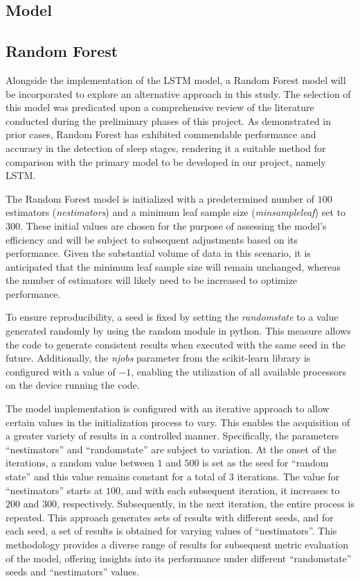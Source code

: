 \documentclass{article}
\begin{document}
    
 \subsection{Model}

 \subsection{Random Forest}

Alongside the implementation of the LSTM model, a Random Forest model will be incorporated to explore an alternative approach in this study. The selection of this model was predicated upon a comprehensive review of the literature conducted during the preliminary phases of this project. As demonstrated in prior cases, Random Forest has exhibited commendable performance and accuracy in the detection of sleep stages, rendering it a suitable method for comparison with the primary model to be developed in our project, namely LSTM.

The Random Forest model is initialized with a predetermined number of $100$ estimators (\textit{n\textunderscore estimators}) and a minimum leaf sample size (\textit{min\textunderscore sample\textunderscore leaf}) set to $300$. These initial values are chosen for the purpose of assessing the model's efficiency and will be subject to subsequent adjustments based on its performance. Given the substantial volume of data in this scenario, it is anticipated that the minimum leaf sample size will remain unchanged, whereas the number of estimators will likely need to be increased to optimize performance.

To ensure reproducibility, a seed is fixed by setting the \textit{random\textunderscore state} to a value generated randomly by using the random module in python. This measure allows the code to generate consistent results when executed with the same seed in the future. Additionally, the \textit{n\textunderscore jobs} parameter from the scikit-learn library is configured with a value of $-1$, enabling the utilization of all available processors on the device running the code.

The model implementation is configured with an iterative approach to allow certain values in the initialization process to vary. This enables the acquisition of a greater variety of results in a controlled manner. Specifically, the parameters ``n\textunderscore estimators'' and ``random\textunderscore state'' are subject to variation. At the onset of the iterations, a random value between $1$ and $500$ is set as the seed for ``random \textunderscore state'' and this value remains constant for a total of 3 iterations. The value for ``n\textunderscore estimators'' starts at $100$, and with each subsequent iteration, it increases to $200$ and $300$, respectively. Subsequently, in the next iteration, the entire process is repeated. This approach generates sets of results with different seeds, and for each seed, a set of results is obtained for varying values of ``n\textunderscore estimators''. This methodology provides a diverse range of results for subsequent metric evaluation of the model, offering insights into its performance under different ``random\textunderscore state'' seeds and ``n\textunderscore estimators'' values.
\end{document}
